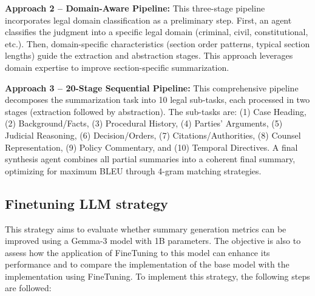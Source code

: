 \documentclass[sigconf]{acmart}
\begin{document}
\textbf{Approach 2 – Domain-Aware Pipeline:} This three-stage pipeline incorporates legal domain classification as a preliminary step. First, an agent classifies the judgment into a specific legal domain (criminal, civil, constitutional, etc.). Then, domain-specific characteristics (section order patterns, typical section lengths) guide the extraction and abstraction stages. This approach leverages domain expertise to improve section-specific summarization.

\textbf{Approach 3 – 20-Stage Sequential Pipeline:} This comprehensive pipeline decomposes the summarization task into 10 legal sub-tasks, each processed in two stages (extraction followed by abstraction). The sub-tasks are: (1) Case Heading, (2) Background/Facts, (3) Procedural History, (4) Parties' Arguments, (5) Judicial Reasoning, (6) Decision/Orders, (7) Citations/Authorities, (8) Counsel Representation, (9) Policy Commentary, and (10) Temporal Directives. A final synthesis agent combines all partial summaries into a coherent final summary, optimizing for maximum BLEU through 4-gram matching strategies.

\subsection{Finetuning LLM strategy}
This strategy aims to evaluate whether summary generation metrics can be improved using a Gemma-3 model with 1B parameters. The objective is also to assess how the application of FineTuning to this model can enhance its performance and to compare the implementation of the base model with the implementation using FineTuning. To implement this strategy, the following steps are followed:
\end{document}
